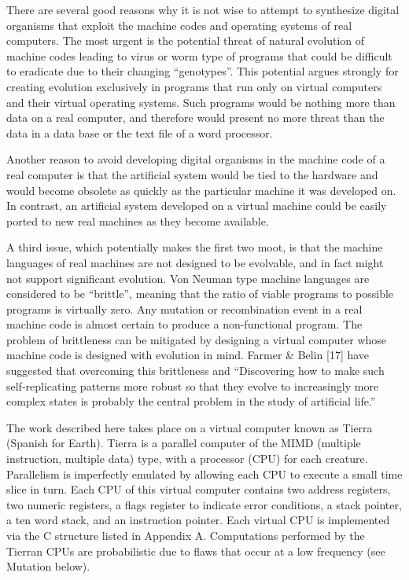 There are several good reasons why it is not wise to attempt to synthesize
digital organisms that exploit the machine codes and operating systems of
real computers.  The most urgent is the potential threat of natural evolution
of machine codes leading to virus or worm type of programs that could
be difficult to eradicate due to their changing ``genotypes''.  This potential
argues strongly for creating evolution exclusively in programs that run only
on virtual computers and their virtual operating systems.  Such programs
would be nothing more than data on a real computer, and therefore would
present no more threat than the data in a data base or the text file of a
word processor.

Another reason to avoid developing digital organisms in the machine code of
a real computer is that the artificial system would be tied to the hardware
and would become obsolete as quickly as the particular machine it was
developed on.  In contrast, an artificial system developed on a virtual
machine could be easily ported to new real machines as they become available.

A third issue, which potentially makes the first two moot, is that
the machine languages of real machines are not designed to be evolvable,
and in fact might not support significant evolution.  Von Neuman type
machine languages are considered to be ``brittle'', meaning that the
ratio of viable programs to possible programs is virtually zero.  Any
mutation or recombination event in a real machine code is almost certain
to produce a non-functional program.  The problem of brittleness can be
mitigated by designing a virtual computer whose machine code is designed
with evolution in mind.  Farmer \& Belin [17] have suggested that
overcoming this brittleness and ``Discovering how to make such self-replicating
patterns more robust so that they evolve to increasingly more complex states
is probably the central problem in the study of artificial life.''

The work described here takes place on a virtual computer known as Tierra
(Spanish for Earth).  Tierra is a parallel computer of the MIMD (multiple
instruction, multiple data) type, with a processor (CPU) for each creature.
Parallelism is imperfectly emulated by allowing each CPU to execute a small
time slice in turn.  Each CPU of this virtual computer contains two address
registers, two numeric registers, a flags register to indicate error
conditions, a stack pointer, a ten word stack, and an instruction pointer.
Each virtual CPU is implemented via the C structure listed in Appendix A.
Computations performed by the Tierran CPUs are probabilistic due to flaws
that occur at a low frequency (see Mutation below).

